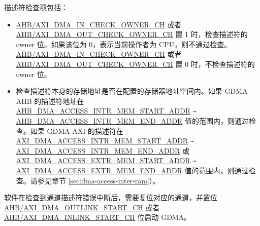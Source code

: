 \documentclass[main\_\_CN.tex]{subfiles}
\begin{document}
描述符检查项包括：
\begin{itemize}
    \item \hyperref[fielddesc:AHBDMAINCHECKOWNERCHN]{AHB/AXI\_DMA\_IN\_CHECK\_OWNER\_CH} 或者 \hyperref[fielddesc:AHBDMAOUTCHECKOWNERCHN]{AHB/AXI\_DMA\_OUT\_CHECK\_OWNER\_CH} 置 1 时，检查描述符的 owner 位。如果该位为 0，表示当前操作者为 CPU，则不通过检查。\hyperref[fielddesc:AHBDMAINCHECKOWNERCHN]{AHB/AXI\_DMA\_IN\_CHECK\_OWNER\_CH} 或者 \hyperref[fielddesc:AHBDMAOUTCHECKOWNERCHN]{AHB/AXI\_DMA\_OUT\_CHECK\_OWNER\_CH} 置 0 时，不检查描述符的 owner 位。\\

    \item 检查描述符本身的存储地址是否在配置的存储器地址空间内。如果 GDMA-AHB 的描述符地址在 \hyperref[fielddesc:AHBDMAACCESSINTRMEMSTARTADDR]{AHB\_DMA\_ACCESS\_INTR\_MEM\_START\_ADDR} \verb+~+ \hyperref[fielddesc:AHBDMAACCESSINTRMEMENDADDR]{AHB\_DMA\_ACCESS\_INTR\_MEM\_END\_ADDR} 值的范围内，则通过检查。如果 GDMA-AXI 的描述符在 \hyperref[fielddesc:AXIDMAACCESSINTRMEMSTARTADDR]{AXI\_DMA\_ACCESS\_INTR\_MEM\_START\_ADDR} \verb+~+ \hyperref[fielddesc:AXIDMAACCESSINTRMEMENDADDR]{AXI\_DMA\_ACCESS\_INTR\_MEM\_END\_ADDR} 或 \hyperref[fielddesc:AXIDMAACCESSEXTRMEMSTARTADDR]{AXI\_DMA\_ACCESS\_EXTR\_MEM\_START\_ADDR} \verb+~+ \hyperref[fielddesc:AXIDMAACCESSEXTRMEMENDADDR]{AXI\_DMA\_ACCESS\_EXTR\_MEM\_END\_ADDR} 值的范围内，则通过检查。请参见章节 \ref{sec:dma-access-inter-ram}）。\\
\end{itemize}

软件在检查到通道描述符错误中断后，需要复位对应的通道，并置位 \hyperref[fielddesc:AHBDMAOUTLINKSTARTCHN]{AHB/AXI\_DMA\_OUTLINK\_START\_CH} 或者  \hyperref[fielddesc:AHBDMAINLINKSTARTCHN]{AHB/AXI\_DMA\_INLINK\_START\_CH} 位启动 GDMA。

\end{document}
